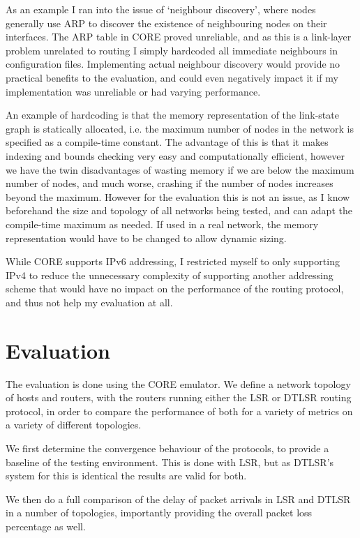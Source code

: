 \documentclass[10pt,twoside,a4paper]{article}
\begin{document}
As an example I ran into the issue of `neighbour discovery', where nodes generally use ARP to discover the existence of neighbouring nodes on their interfaces. The ARP table in CORE proved unreliable, and as this is a link-layer problem unrelated to routing I simply hardcoded all immediate neighbours in configuration files. Implementing actual neighbour discovery would provide no practical benefits to the evaluation, and could even negatively impact it if my implementation was unreliable or had varying performance.

An example of hardcoding is that the memory representation of the link-state graph is statically allocated, i.e. the maximum number of nodes in the network is specified as a compile-time constant. The advantage of this is that it makes indexing and bounds checking very easy and computationally efficient, however we have the twin disadvantages of wasting memory if we are below the maximum number of nodes, and much worse, crashing if the number of nodes increases beyond the maximum. However for the evaluation this is not an issue, as I know beforehand the size and topology of all networks being tested, and can adapt the compile-time maximum as needed. If used in a real network, the memory representation would have to be changed to allow dynamic sizing.

While CORE supports IPv6 addressing, I restricted myself to only supporting IPv4 to reduce the unnecessary complexity of supporting another addressing scheme that would have no impact on the performance of the routing protocol, and thus not help my evaluation at all.


\section{Evaluation}

The evaluation is done using the CORE emulator. We define a network topology of hosts and routers, with the routers running either the LSR or DTLSR routing protocol, in order to compare the performance of both for a variety of metrics on a variety of different topologies.

We first determine the convergence behaviour of the protocols, to provide a baseline of the testing environment. This is done with LSR, but as DTLSR's system for this is identical the results are valid for both.

We then do a full comparison of the delay of packet arrivals in LSR and DTLSR in a number of topologies, importantly providing the overall packet loss percentage as well.
\end{document}
